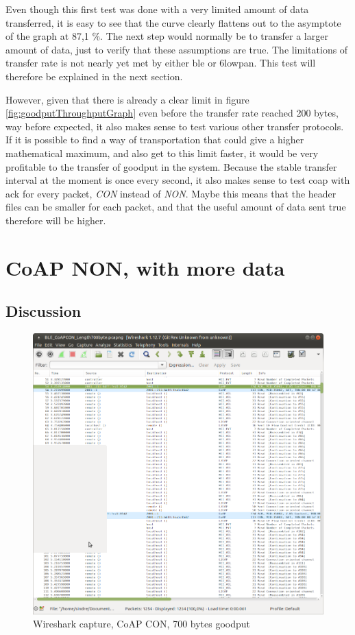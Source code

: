 Even though this first test was done with a very limited amount of data transferred, it is easy to see that the curve clearly flattens out to the asymptote of the graph at 87,1 \%. The next step would normally be to transfer a larger amount of data, just to verify that these assumptions are true. The limitations of transfer rate is not nearly yet met by either \gls{ble} or \gls{6lowpan}. This test will therefore be explained in the next section. 


However, given that there is already a clear limit in figure \ref{fig:goodputThroughputGraph} even before the transfer rate reached 200 bytes, way before expected, it also makes sense to test various other transfer protocols. If it is possible to find a way of transportation that could give a higher mathematical maximum, and also get to this limit faster, it would be very profitable to the transfer of goodput in the system. Because the stable transfer interval at the moment is once every second, it also makes sense to test \gls{coap} with \gls{ack} for every packet, \textit{CON} instead of \textit{NON}. Maybe this means that the header files can be smaller for each packet, and that the useful amount of data sent true therefore will be higher. 


\section{CoAP NON, with more data}

\subsection{Discussion}

\begin{figure}[ht]
    \centering
    \includegraphics[width=\textwidth]{wireshark_CoAP_CON700bytes.png}    
    \caption{Wireshark capture, CoAP CON, 700 bytes goodput}
    \label{fig:coapCON700Wireshark}
\end{figure}

